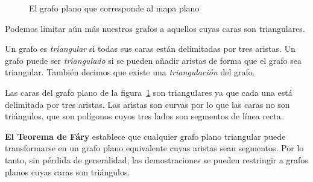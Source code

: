 \begin{figure}[t]
\begin{minipage}{.45\textwidth}
\begin{center}
\caption{El grafo plano que corresponde al mapa plano}\label{f.five-planar-graph-graph}
\end{center}
\end{minipage}
\end{figure}

Podemos limitar aún más nuestros grafos a aquellos cuyas caras son triangulares.

\begin{definition}
Un grafo es \emph{triangular} si todas sus caras están delimitadas por tres aristas. Un grafo puede ser \emph{triangulado} si se pueden añadir aristas de forma que el grafo sea triangular. También decimos que existe una \emph{triangulación} del grafo.
\end{definition}

\begin{example}
Las caras del grafo plano de la figura~\ref{f.five-planar-graph-graph} son triangulares ya que cada una está delimitada por tres aristas. Las aristas son curvas por lo que las caras no son triángulos, que son polígonos cuyos tres lados son segmentos de línea recta.
\end{example}

\begin{advanced}
\textbf{El Teorema de F\'{a}ry} establece que cualquier grafo plano triangular puede transformarse en un grafo plano equivalente cuyas aristas sean segmentos. Por lo tanto, sin pérdida de generalidad, las demostraciones se pueden restringir a grafos planos cuyas caras son triángulos.
\end{advanced}

